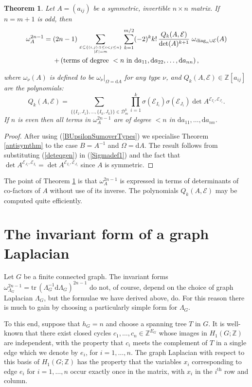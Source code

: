 \documentclass[10pt]{amsart}
\newcommand{\ZZ}{{\mathbb Z}}
\newcommand{\dd}{\mathrm{d}}
\newcommand{\sE}{\mathcal{E}}
\newcommand{\tr}{\mathrm{tr}\,}
\newcommand{\diag}{\mathrm{diag}}
\theoremstyle{plain}
\newtheorem{thm}{Theorem}
\newcommand{\0}{\color{blue}{\mathsf{0}}}
\begin{document}
\begin{thm}\label{invformthm}
Let $A=(a_{ij})$ be a symmetric, invertible $n\times n$ matrix.  If $n=m+1$ is odd, then
\begin{multline}\label{formula2A}
\omega_A^{2n-1}=(2n-1)\sum_{\genfrac{}{}{0pt}{}{\sE\subseteq\{(i,j): 1\leq i<j\leq n\}}{|\sE|=m}}\sum_{k=1}^{m/2} (-2)^k k! \, \frac{ Q_k(A,\sE)}{\det (A)^{k+1}}\; \omega_{\diag_n\cup\sE}(A) \\
+ \left(\text{terms of degree } <n \hbox{ in }\dd a_{11},\dd a_{22},\ldots,\dd a_{nn}\right),
\end{multline}

where $\omega_{\nu}(A)$ is defined to be $\omega_{\nu}\big|_{\Omega=\dd A}$ for any type $\nu$, and 
 $Q_k(A,\sE)\in\ZZ[a_{ij}]$ are the polynomials:
\begin{equation}\label{Qdef}
Q_k(A,\sE)= \sum_{  \{\{I_1,J_1\} , \ldots, \{ I_k, J_k\} \} \in \mathcal{D}^k_{m}  }  \prod_{i=1}^k\sigma(\sE_{I_i})\sigma(\sE_{J_i})\det A^{\sE_{I_i},\sE_{J_i}}.
\end{equation}
If  $n$ is even then all terms in  $\omega_A^{2n-1}$ are of degree $<n$ in  $\dd a_{11},\ldots,\dd a_{nn}$.
\end{thm}
\begin{proof}
After using (\ref{BUpsilonSumoverTypes}) we specialise  Theorem \ref{antisymthm} to  the case $B=A^{-1}$ and $\Omega=\dd A$.
The result follows from substituting (\ref{deteqgen}) in (\ref{Sigmadef1}) and the fact that 
 $\det A^{\sE_{J_i},\sE_{I_i}}=\det A^{\sE_{I_i},\sE_{J_i}}$ since $A$ is symmetric. 
\end{proof}

The point  of Theorem \ref{invformthm} is that $\omega_A^{2n-1}$ is expressed in terms of determinants of co-factors of $A$ without use of its inverse.
The polynomials $Q_k(A,\sE)$ may be computed  quite efficiently.

\section{The invariant form of a graph Laplacian}\label{sectformula}
Let $G$ be a finite connected graph. The invariant forms  $\omega^{2n-1}_{\Lambda_G} = \tr (\Lambda_G^{-1} \dd \Lambda_G)^{2n-1}$ do not, of course, depend on the choice of graph Laplacian $\Lambda_G$, but the formulae 
we have derived above, do. 
For this reason there is much to gain by choosing a particularly simple form for $\Lambda_G$.


To this end,  suppose that $h_G=n$ and choose a spanning tree $T$ in $G$. 
It is well-known that there exist closed cycles  $c_1,\ldots, c_n \in \ZZ^{E_G}$ whose images in   $H_1(G;\ZZ)$ are independent, with the property  that $c_i$ meets the complement of $T$ in a single edge which we denote by  $e_i$, for $i=1,\ldots, n$.  The graph Laplacian with respect to this basis of $H_1(G;\ZZ)$ has the property that the variables $x_i$ corresponding to edge $e_i$ for $i=1,\ldots,n$ occur exactly once in the matrix, with $x_i$ in the $i^{\mathrm{th}}$ row and column.  
\end{document}
